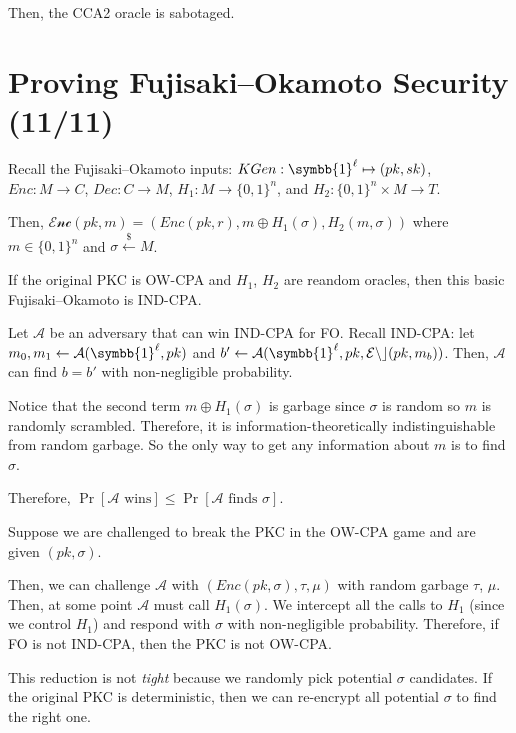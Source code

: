 \documentclass[notes]{agony}
\newcommand{\xgets}{\xleftarrow}
\newcommand{\ndgets}{\xgets{\mathdollar}}
\newcommand{\one}{\symbb{1}}
\begin{document}
Then, the CCA2 oracle is sabotaged.

\section{Proving Fujisaki--Okamoto Security (11/11)}

Recall the Fujisaki--Okamoto inputs:
$KGen : \one^\ell \mapsto (pk, sk)$,
$Enc : M \to C$,
$Dec : C \to M$,
$H_1 : M \to \{0,1\}^n$, and
$H_2 : \{0,1\}^n \times M \to T$.

Then, $\mathcal{Enc}(pk, m) = (Enc(pk, r), m \oplus H_1(\sigma), H_2(m, \sigma))$
where $m \in \{0,1\}^n$ and $\sigma \ndgets M$.

\begin{theorem}
  If the original PKC is OW-CPA and $H_1$, $H_2$ are reandom oracles,
  then this basic Fujisaki--Okamoto is IND-CPA.
\end{theorem}
\begin{prf}
  Let $\mathcal{A}$ be an adversary that can win IND-CPA for FO.
  Recall IND-CPA: let $m_0,m_1 \gets \mathcal{A}(\one^\ell, pk)$
  and $b' \gets \mathcal{A}(\one^\ell, pk, \mathcal{Enc}(pk, m_b))$.
  Then, $\mathcal{A}$ can find $b = b'$ with non-negligible probability.

  Notice that the second term $m \oplus H_1(\sigma)$ is garbage
  since $\sigma$ is random so $m$ is randomly scrambled.
  Therefore, it is information-theoretically indistinguishable from random garbage.
  So the only way to get any information about $m$ is to find $\sigma$.

  Therefore, $\Pr[\text{$\mathcal{A}$ wins}] \leq \Pr[\text{$\mathcal{A}$ finds $\sigma$}]$.

  Suppose we are challenged to break the PKC in the OW-CPA game
  and are given $(pk,\sigma)$.

  Then, we can challenge $\mathcal{A}$
  with $(Enc(pk, \sigma), \tau, \mu)$ with random garbage $\tau$, $\mu$.
  Then, at some point $\mathcal{A}$ must call $H_1(\sigma)$.
  We intercept all the calls to $H_1$ (since we control $H_1$)
  and respond with $\sigma$ with non-negligible probability.
  Therefore, if FO is not IND-CPA, then the PKC is not OW-CPA.
\end{prf}

This reduction is not \emph{tight} because we randomly pick potential $\sigma$ candidates.
If the original PKC is deterministic,
then we can re-encrypt all potential $\sigma$ to find the right one.
\end{document}
